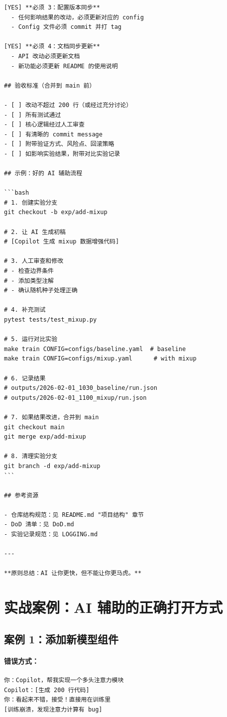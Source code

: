 \begin{verbatim}
[YES] **必须 3：配置版本同步**
  - 任何影响结果的改动，必须更新对应的 config
  - Config 文件必须 commit 并打 tag

[YES] **必须 4：文档同步更新**
  - API 改动必须更新文档
  - 新功能必须更新 README 的使用说明

## 验收标准（合并到 main 前）

- [ ] 改动不超过 200 行（或经过充分讨论）
- [ ] 所有测试通过
- [ ] 核心逻辑经过人工审查
- [ ] 有清晰的 commit message
- [ ] 附带验证方式、风险点、回滚策略
- [ ] 如影响实验结果，附带对比实验记录

## 示例：好的 AI 辅助流程

```bash
# 1. 创建实验分支
git checkout -b exp/add-mixup

# 2. 让 AI 生成初稿
# [Copilot 生成 mixup 数据增强代码]

# 3. 人工审查和修改
# - 检查边界条件
# - 添加类型注解
# - 确认随机种子处理正确

# 4. 补充测试
pytest tests/test_mixup.py

# 5. 运行对比实验
make train CONFIG=configs/baseline.yaml  # baseline
make train CONFIG=configs/mixup.yaml      # with mixup

# 6. 记录结果
# outputs/2026-02-01_1030_baseline/run.json
# outputs/2026-02-01_1100_mixup/run.json

# 7. 如果结果改进，合并到 main
git checkout main
git merge exp/add-mixup

# 8. 清理实验分支
git branch -d exp/add-mixup
```

## 参考资源

- 仓库结构规范：见 README.md "项目结构" 章节
- DoD 清单：见 DoD.md
- 实验记录规范：见 LOGGING.md

---

**原则总结：AI 让你更快，但不能让你更马虎。**
\end{verbatim}

\section{实战案例：AI 辅助的正确打开方式}

\subsection{案例 1：添加新模型组件}

\paragraph{错误方式：}
\begin{verbatim}
你：Copilot，帮我实现一个多头注意力模块
Copilot：[生成 200 行代码]
你：看起来不错，接受！直接用在训练里
[训练崩溃，发现注意力计算有 bug]
\end{verbatim}

